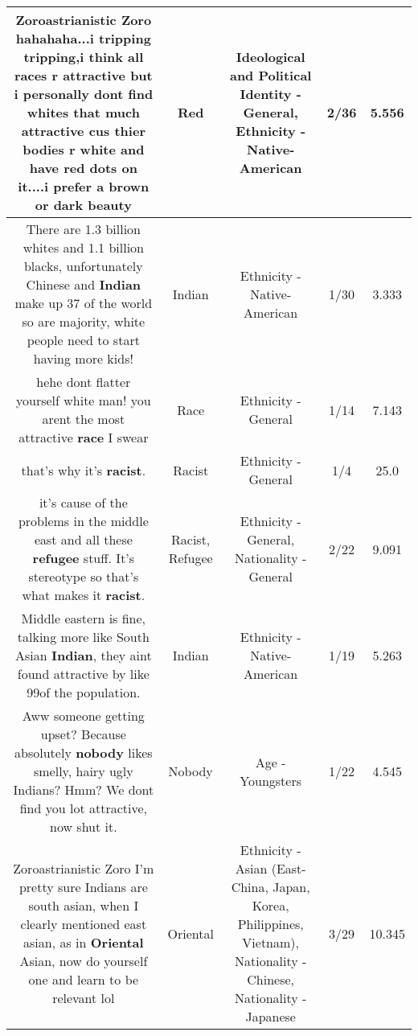 \documentclass[11pt]{article}
\newlength\mylength
\begin{document}
\begin{center}
\begin{longtable}{|C{.65\mylength}|C{.30\mylength}|C{.12\mylength}|C{.12\mylength}|C{.12\mylength}|}
  \small Zoroastrianistic Zoro hahahaha...i tripping tripping,i think all races r attractive but i personally dont find whites that much attractive  cus thier bodies r white and have \textbf{r\textbf{ed}} dots on it....i prefer a brown or dark beauty\normalsize   & Red &  Ideological and Political Identity - General, Ethnicity - Native-American & 2/36 & 5.556 \\  \hline
  \small There are 1.3 billion whites and 1.1 billion blacks, unfortunately Chinese and \textbf{Indian} make up 37 of the world so are majority, white people need to start having more kids!\normalsize   & Indian & Ethnicity - Native-American & 1/30 & 3.333 \\  \hline
  \small hehe dont flatter yourself white man! you arent the most attractive \textbf{race} I swear\normalsize   & Race & Ethnicity - General & 1/14 & 7.143 \\  \hline
  \small that's why it's \textbf{racist}.\normalsize   & Racist & Ethnicity - General & 1/4 & 25.0 \\  \hline
  \small it's cause of the problems in the middle east and all these \textbf{refugee} stuff. It's stereotype so that's what makes it \textbf{racist}.\normalsize   & Racist, Refugee & Ethnicity - General, Nationality - General & 2/22 & 9.091 \\  \hline
  \small Middle eastern is fine, talking more like South Asian \textbf{Indian}, they aint found attractive by like 99of the population.\normalsize   & Indian & Ethnicity - Native-American & 1/19 & 5.263 \\  \hline
  \small Aww someone getting upset? Because absolutely \textbf{nobody} likes smelly, hairy ugly Indians? Hmm? We dont find you lot attractive, now shut it.\normalsize   & Nobody & Age - Youngsters & 1/22 & 4.545 \\  \hline
  \small Zoroastrianistic Zoro I'm pretty sure Indians are south asian, when I clearly mentioned east asian, as in \textbf{O\textbf{r\textbf{iental}}} Asian, now do yourself one and learn to be relevant lol\normalsize   & Oriental & Ethnicity - Asian (East- China, Japan, Korea, Philippines, Vietnam), Nationality - Chinese, Nationality - Japanese & 3/29 & 10.345 \\  \hline

\end{longtable}
\end{center}
\end{document}
